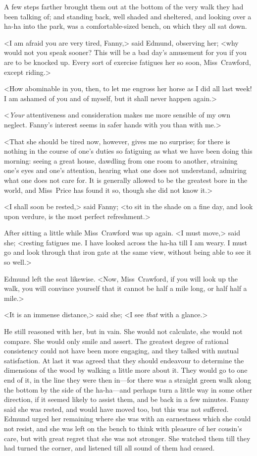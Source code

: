 A few steps farther brought them out at the bottom of the very walk they had been talking of; and standing back, well shaded and sheltered, and looking over a ha-ha into the park, was a comfortable-sized bench, on which they all sat down.

<I am afraid you are very tired, Fanny,> said Edmund, observing her; <why would not you speak sooner? This will be a bad day's amusement for you if you are to be knocked up. Every sort of exercise fatigues her so soon, Miss~Crawford, except riding.>

<How abominable in you, then, to let me engross her horse as I did all last week! I am ashamed of you and of myself, but it shall never happen again.>

<\textit{Your}  attentiveness and consideration makes me more sensible of my own neglect. Fanny's interest seems in safer hands with you than with me.>

<That she should be tired now, however, gives me no surprise; for there is nothing in the course of one's duties so fatiguing as what we have been doing this morning: seeing a great house, dawdling from one room to another, straining one's eyes and one's attention, hearing what one does not understand, admiring what one does not care for. It is generally allowed to be the greatest bore in the world, and Miss~Price has found it so, though she did not know it.>

<I shall soon be rested,> said Fanny; <to sit in the shade on a fine day, and look upon verdure, is the most perfect refreshment.>

After sitting a little while Miss~Crawford was up again. <I must move,> said she; <resting fatigues me. I have looked across the ha-ha till I am weary. I must go and look through that iron gate at the same view, without being able to see it so well.>

Edmund left the seat likewise. <Now, Miss~Crawford, if you will look up the walk, you will convince yourself that it cannot be half a mile long, or half half a mile.>

<It is an immense distance,> said she; <I see \textit{that}  with a glance.>

He still reasoned with her, but in vain. She would not calculate, she would not compare. She would only smile and assert. The greatest degree of rational consistency could not have been more engaging, and they talked with mutual satisfaction. At last it was agreed that they should endeavour to determine the dimensions of the wood by walking a little more about it. They would go to one end of it, in the line they were then in—for there was a straight green walk along the bottom by the side of the ha-ha—and perhaps turn a little way in some other direction, if it seemed likely to assist them, and be back in a few minutes. Fanny said she was rested, and would have moved too, but this was not suffered. Edmund urged her remaining where she was with an earnestness which she could not resist, and she was left on the bench to think with pleasure of her cousin's care, but with great regret that she was not stronger. She watched them till they had turned the corner, and listened till all sound of them had ceased. 
